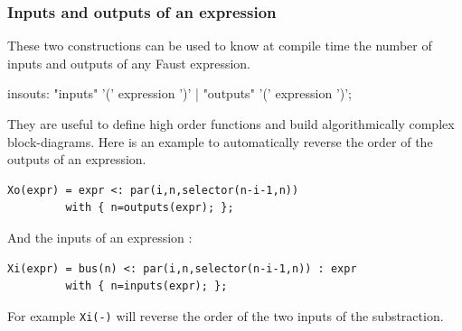 \subsubsection{Inputs and outputs of an expression}
These two constructions can be used to know at compile time the number of inputs and outputs of any Faust expression. 

\begin{rail}
insouts: "inputs" '(' expression ')'
       | "outputs" '(' expression ')';
\end{rail}

They are useful to define high order functions and build algorithmically complex block-diagrams. Here is an example to automatically reverse the order of the outputs of an expression.

\begin{lstlisting}
Xo(expr) = expr <: par(i,n,selector(n-i-1,n)) 
		 with { n=outputs(expr); };
\end{lstlisting}

And the inputs of an expression :

\begin{lstlisting}
Xi(expr) = bus(n) <: par(i,n,selector(n-i-1,n)) : expr 
		 with { n=inputs(expr); };
\end{lstlisting}

For example \lstinline'Xi(-)' will reverse the order of the two inputs of the substraction.






